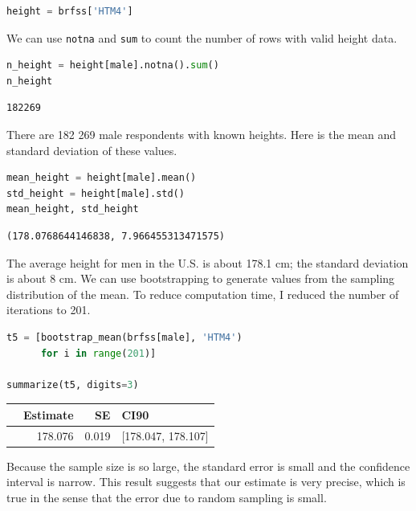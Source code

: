 \begin{lstlisting}[language=Python,style=source]
height = brfss['HTM4']
\end{lstlisting}

We can use \passthrough{\lstinline!notna!} and
\passthrough{\lstinline!sum!} to count the number of rows with valid
height data.

\begin{lstlisting}[language=Python,style=source]
n_height = height[male].notna().sum()
n_height
\end{lstlisting}

\begin{lstlisting}[style=output]
182269
\end{lstlisting}

There are 182 269 male respondents with known heights. Here is the mean
and standard deviation of these values.

\begin{lstlisting}[language=Python,style=source]
mean_height = height[male].mean()
std_height = height[male].std()
mean_height, std_height
\end{lstlisting}

\begin{lstlisting}[style=output]
(178.0768644146838, 7.966455313471575)
\end{lstlisting}

The average height for men in the U.S. is about 178.1 cm; the standard
deviation is about 8 cm. We can use bootstrapping to generate values
from the sampling distribution of the mean. To reduce computation time,
I reduced the number of iterations to 201.

\begin{lstlisting}[language=Python,style=source]
t5 = [bootstrap_mean(brfss[male], 'HTM4')
      for i in range(201)]

summarize(t5, digits=3)
\end{lstlisting}

\begin{tabular}{lrrl}
\toprule
{} &  Estimate &     SE &                CI90 \\
\midrule
{} &   178.076 &  0.019 &  [178.047, 178.107] \\
\bottomrule
\end{tabular}

Because the sample size is so large, the standard error is small and the
confidence interval is narrow. This result suggests that our estimate is
very precise, which is true in the sense that the error due to random
sampling is small.


